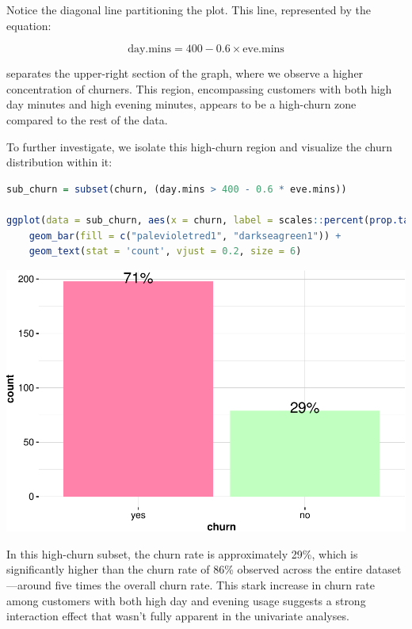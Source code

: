 \documentclass[
]{book}
\theoremstyle{definition}
\theoremstyle{definition}
\theoremstyle{definition}
\theoremstyle{definition}
\theoremstyle{remark}
\begin{document}
Notice the diagonal line partitioning the plot. This line, represented by the equation:

\[
\text{day.mins} = 400 - 0.6 \times \text{eve.mins}
\]

separates the upper-right section of the graph, where we observe a higher concentration of churners. This region, encompassing customers with both high day minutes and high evening minutes, appears to be a high-churn zone compared to the rest of the data.

To further investigate, we isolate this high-churn region and visualize the churn distribution within it:

\begin{lstlisting}[language=R]
sub_churn = subset(churn, (day.mins > 400 - 0.6 * eve.mins))

ggplot(data = sub_churn, aes(x = churn, label = scales::percent(prop.table(stat(count))))) +
    geom_bar(fill = c("palevioletred1", "darkseagreen1")) + 
    geom_text(stat = 'count', vjust = 0.2, size = 6)
\end{lstlisting}

\begin{center}\includegraphics{EDA_files/figure-latex/unnamed-chunk-16-1} \end{center}

In this high-churn subset, the churn rate is approximately 29\%, which is significantly higher than the churn rate of 86\% observed across the entire dataset---around five times the overall churn rate. This stark increase in churn rate among customers with both high day and evening usage suggests a strong interaction effect that wasn't fully apparent in the univariate analyses.
\end{document}
